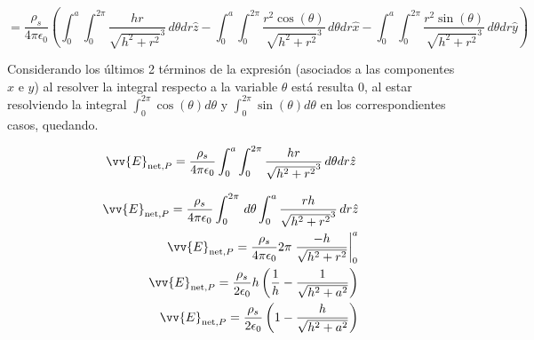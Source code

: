 \documentclass[11pt]{article}
\begin{document}
\begin{solucion}
    \begin{equation}
        = \frac{\rho_s}{4\pi\epsilon_0}\left(\int_{0}^{a}\int_{0}^{2\pi} \frac{hr}{\sqrt{h^2+ r^2}^3} \,d\theta dr\hat{z} - \int_{0}^{a}\int_{0}^{2\pi} \frac{r^2\cos(\theta)}{\sqrt{h^2+ r^2}^3}\,d\theta dr\hat{x} - \int_{0}^{a}\int_{0}^{2\pi} \frac{r^2\sin(\theta)}{\sqrt{h^2+ r^2}^3}\,d\theta dr\hat{y}\right)
    \end{equation}

    Considerando los últimos 2 términos de la expresión (asociados a las componentes $x$ e $y$) al resolver la integral respecto a la variable $\theta$ está resulta 0, al estar resolviendo la integral $\int_{0}^{2\pi} \cos(\theta) d\theta$ y $\int_{0}^{2\pi} \sin(\theta) d\theta$ en los correspondientes casos, quedando.

    \begin{equation}
        \vv{E}_{\text{net}, P} = \frac{\rho_s}{4\pi\epsilon_0}\int_{0}^{a}\int_{0}^{2\pi} \frac{hr}{\sqrt{h^2+ r^2}^3} \,d\theta dr\hat{z}
    \end{equation}

    \begin{align}
        \vv{E}_{\text{net}, P} = \frac{\rho_s}{4\pi\epsilon_0}\int_{0}^{2\pi}\,d\theta \int_{0}^{a} \frac{rh}{\sqrt{h^2+ r^2}^3} \,dr \hat{z}
        \\
        \vv{E}_{\text{net}, P} = \frac{\rho_s}{4\pi\epsilon_0}2\pi \left.\frac{-h}{\sqrt{h^2 + r^2}}\right|_0^a
        \\
        \vv{E}_{\text{net}, P} = \frac{\rho_s}{2\epsilon_0} h\left(\frac{1}{h} - \frac{1}{\sqrt{h^2 + a^2}}\right)
        \\
        \vv{E}_{\text{net}, P}= \frac{\rho_s}{2\epsilon_0} \left(1 - \frac{h}{\sqrt{h^2 + a^2}}\right)
    \end{align}

\end{solucion}
\end{document}
